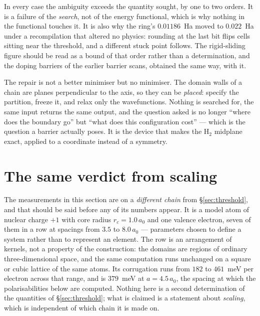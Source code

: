 \documentclass[11pt]{article}
\begin{document}
\noindent In every case the ambiguity exceeds the quantity sought, by one to two orders. It is a
failure of the \emph{search}, not of the energy functional, which is why nothing in the functional
touches it. It is also why the ring's $0.01186$~Ha moved to $0.022$~Ha under a recompilation that
altered no physics: rounding at the last bit flips cells sitting near the threshold, and a different
stuck point follows. The rigid-sliding figure should be read as a bound of that order rather than a
determination, and the doping barriers of the earlier barrier scans, obtained the same way, with it.

The repair is not a better minimiser but no minimiser. The domain walls of a chain are planes
perpendicular to the axis, so they can be \emph{placed}: specify the partition, freeze it, and relax
only the wavefunctions. Nothing is searched for, the same input returns the same output, and the
question asked is no longer ``where does the boundary go'' but ``what does this configuration
cost'' --- which is the question a barrier actually poses. It is the device that makes the
$\mathrm{H}_2$ midplane exact, applied to a coordinate instead of a symmetry.


\section{The same verdict from scaling}\label{sec:scaling}

The measurements in this section are on a \emph{different chain} from \S\ref{sec:threshold}, and
that should be said before any of its numbers appear. It is a model atom of nuclear charge $+1$
with core radius $r_c=1.0\,a_0$ and one valence electron, seven of them in a row at spacings from
$3.5$ to $8.0\,a_0$ --- parameters chosen to define a system rather than to represent an element.
The row is an arrangement of kernels, not a property of the construction: the domains are regions of
ordinary three-dimensional space, and the same computation runs unchanged on a square or cubic
lattice of the same atoms. Its corrugation runs from
$182$ to $461$~meV per electron across that range, and is $379$~meV at $a=4.5\,a_0$, the spacing at
which the polarisabilities below are computed. Nothing here is a second determination of the
quantities of \S\ref{sec:threshold}; what is claimed is a statement about \emph{scaling}, which is
independent of which chain it is made on.
\end{document}
